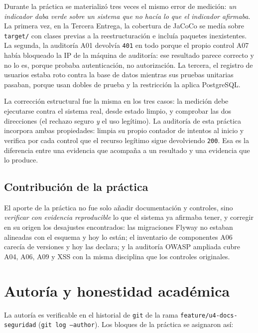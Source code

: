 \documentclass[11pt,a4paper]{article}
\begin{document}
Durante la práctica se materializó tres veces el mismo error de medición:
\emph{un indicador daba verde sobre un sistema que no hacía lo que el
indicador afirmaba}. La primera vez, en la Tercera Entrega, la cobertura de
JaCoCo se medía sobre \texttt{target/} con clases previas a la
reestructuración e incluía paquetes inexistentes. La segunda, la auditoría
A01 devolvía \texttt{401} en todo porque el propio control A07 había bloqueado
la IP de la máquina de auditoría: ese resultado parece correcto y no lo es,
porque probaba autenticación, no autorización. La tercera, el registro de
usuarios estaba roto contra la base de datos mientras sus pruebas unitarias
pasaban, porque usan dobles de prueba y la restricción la aplica PostgreSQL.

La corrección estructural fue la misma en los tres casos: la medición debe
ejecutarse contra el sistema real, desde estado limpio, y comprobar las dos
direcciones (el rechazo seguro \emph{y} el uso legítimo). La auditoría de
esta práctica incorpora ambas propiedades: limpia su propio contador de
intentos al inicio y verifica por cada control que el recurso legítimo sigue
devolviendo \texttt{200}. Esa es la diferencia entre una evidencia que
acompaña a un resultado y una evidencia que lo produce.

\subsection{Contribución de la práctica}

El aporte de la práctica no fue solo añadir documentación y controles, sino
\emph{verificar con evidencia reproducible} lo que el sistema ya afirmaba
tener, y corregir en su origen los desajustes encontrados: las migraciones
Flyway no estaban alineadas con el esquema y hoy lo están; el inventario de
componentes A06 carecía de versiones y hoy las declara; y la auditoría OWASP
ampliada cubre A04, A06, A09 y XSS con la misma disciplina que los controles
originales.

\section{Autoría y honestidad académica}
\label{sec:autorias}

La autoría es verificable en el historial de \texttt{git} de la rama
\texttt{feature/u4-docs-seguridad} (\texttt{git log --author}). Los bloques
de la práctica se asignaron así:
\end{document}
